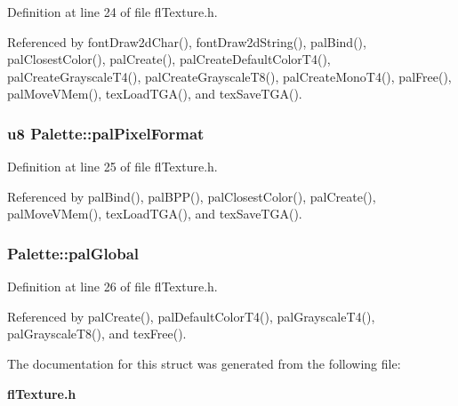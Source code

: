 Definition at line 24 of file fl\-Texture.h.

Referenced by font\-Draw2d\-Char(), font\-Draw2d\-String(), pal\-Bind(), pal\-Closest\-Color(), pal\-Create(), pal\-Create\-Default\-Color\-T4(), pal\-Create\-Grayscale\-T4(), pal\-Create\-Grayscale\-T8(), pal\-Create\-Mono\-T4(), pal\-Free(), pal\-Move\-VMem(), tex\-Load\-TGA(), and tex\-Save\-TGA().
\subsubsection{\setlength{\rightskip}{0pt plus 5cm}u8 {\bf Palette::pal\-Pixel\-Format}}\label{structPalette_96c48e843d2cd4587403bc27a7d59139}




Definition at line 25 of file fl\-Texture.h.

Referenced by pal\-Bind(), pal\-BPP(), pal\-Closest\-Color(), pal\-Create(), pal\-Move\-VMem(), tex\-Load\-TGA(), and tex\-Save\-TGA().
\subsubsection{ {\bf Palette::pal\-Global}}\label{structPalette_24d0a8190c068f2f610b3111f2ba07be}




Definition at line 26 of file fl\-Texture.h.

Referenced by pal\-Create(), pal\-Default\-Color\-T4(), pal\-Grayscale\-T4(), pal\-Grayscale\-T8(), and tex\-Free().

The documentation for this struct was generated from the following file:\begin{CompactItemize}
\item 
{\bf fl\-Texture.h}\end{CompactItemize}
